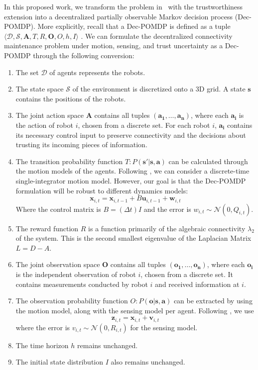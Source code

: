 \documentclass[conf]{new-aiaa}
\newcommand{\A }{\boldsymbol{A}}
\newcommand{\D}{\mathscr{D}}
\newcommand{\N}{\mathcal{N}}
\newcommand{\Observation}{\boldsymbol{O}}
\newcommand{\Sstate}{\mathcal{S}}
\newcommand{\ucontrol}{\boldsymbol{u}}
\newcommand{\verr}{\boldsymbol{v}}
\newcommand{\w}{\boldsymbol{w}}
\newcommand{\x}{\boldsymbol{x}}
\newcommand{\z}{\boldsymbol{z}}
\begin{document}
In this proposed work, we transform the problem in~\cite{Shetty2021} with the trustworthiness extension into a decentralized partially observable Markov decision process (Dec-POMDP). More explicitly, recall that a Dec-POMDP is defined as a tuple $\langle \D, \Sstate, \A, T, R, \Observation, O, h, I \rangle$ \cite{Oliehoek2012}. We can formulate the decentralized connectivity maintenance problem under motion, sensing, and trust uncertainty as a Dec-POMDP through the following conversion:
\begin{enumerate}
    \item The set $\D$ of agents represents the robots.
    \item The state space $\Sstate$ of the environment is discretized onto a 3D grid. A state $\boldsymbol{s}$ contains the positions of the robots.
    \item The joint action space $\A$ contains all tuples $\left(\boldsymbol{a_1}, \dots, \boldsymbol{a_n} \right)$, where each $\boldsymbol{a_i}$ is the action of robot $i$, chosen from a discrete set. For each robot $i$, $\boldsymbol{a_i}$ contains its necessary control input to preserve connectivity and the decisions about trusting its incoming pieces of information.
    \item The transition probability function $T: P(\boldsymbol{s'}|\boldsymbol{s}, \boldsymbol{a})$ can be calculated through the motion models of the agents. Following \cite{Shetty2021}, we can consider a discrete-time single-integrator motion model. However, our goal is that the Dec-POMDP formulation will be robust to different dynamics models:
\begin{equation}
    \x_{i, t} = \x_{i, t - 1} + B \ucontrol_{i, t - 1} + \w_{i, t}
\end{equation}
Where the control matrix is $B =  (\Delta t) I$ and the error is $w_{i, t} \sim \N(0, Q_{i, t})$.
    \item The reward function $R$ is a function primarily of the algebraic connectivity $\lambda_2$ of the system. This is the second smallest eigenvalue of the Laplacian Matrix $L = D - A$.
    \item The joint observation space $\Observation $ contains all tuples $\left(\boldsymbol{o_1}, \dots, \boldsymbol{o_n} \right)$, where each $\boldsymbol{o_i}$ is the independent observation of robot $i$, chosen from a discrete set. It contains measurements conducted by robot $i$ and received information at $i$.
    \item The observation probability function $O: P(\boldsymbol{o}|\boldsymbol{s},\boldsymbol{a})$ can be extracted by using the motion model, along with the sensing model per agent. Following \cite{Shetty2021}, we use
\begin{equation}
    \z_{i, t} = \x_{i,t} + \verr_{i, t}
\end{equation}
where the error is $v_{i, t} \sim \N(0, R_{i, t})$ for the sensing model.
    \item The time horizon $h$ remains unchanged.
    \item The initial state distribution $I$ also remains unchanged.
\end{enumerate}
\end{document}
